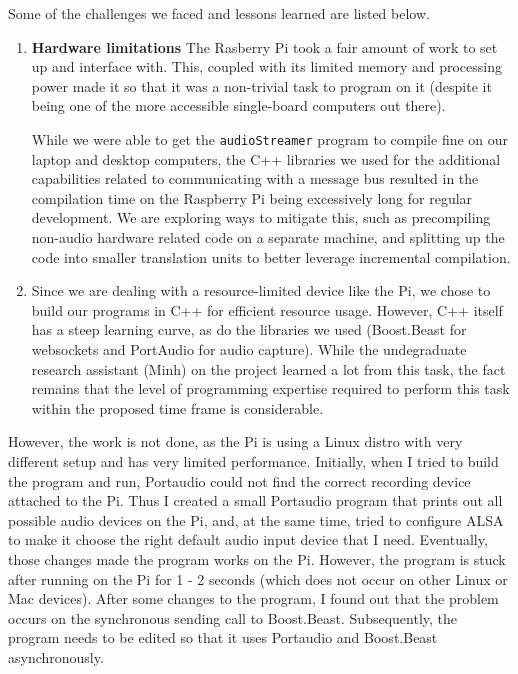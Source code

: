 Some of the challenges we faced and lessons learned are listed below.

\begin{enumerate}

    \item \textbf{Hardware limitations} The Rasberry Pi took a fair amount of
        work to set up and interface with. This, coupled with its limited
        memory and processing power made it so that it was a non-trivial task
        to program on it (despite it being one of the more accessible
        single-board computers out there). 

        While we were able to get the
        \texttt{audioStreamer} program to compile fine on our laptop and
        desktop computers, the C++ libraries we used for the additional
        capabilities related to communicating with a message bus resulted in
        the compilation time on the Raspberry Pi being excessively long for
        regular development. We are exploring ways to mitigate this, such as
        precompiling non-audio hardware related code on a separate machine, and
        splitting up the code into smaller translation units to better leverage
        incremental compilation.

    \item Since we are dealing with a resource-limited device like the Pi, we
        chose to build our programs in C++ for efficient resource usage.
        However, C++ itself has a steep learning curve, as do the libraries we
        used (Boost.Beast for websockets and PortAudio for audio capture).
        While the undegraduate research assistant (Minh) on the project learned a lot
        from this task, the fact remains that the level of programming
        expertise required to perform this task within the proposed time frame
        is considerable.

        
\end{enumerate}


However, the work is not done, as the Pi is using a Linux distro with very
different setup and has very limited performance. Initially, when I tried to
build the program and run, Portaudio could not find the correct recording
device attached to the Pi. Thus I created a small Portaudio program that prints
out all possible audio devices on the Pi, and, at the same time, tried to
configure ALSA to make it choose the right default audio input device that I
need. Eventually, those changes made the program works on the Pi. However, the
program is stuck after running on the Pi for 1 - 2 seconds (which does not
occur on other Linux or Mac devices). After some changes to the program, I
found out that the problem occurs on the synchronous sending call to
Boost.Beast. Subsequently, the program needs to be edited so that it uses
Portaudio and Boost.Beast asynchronously.

